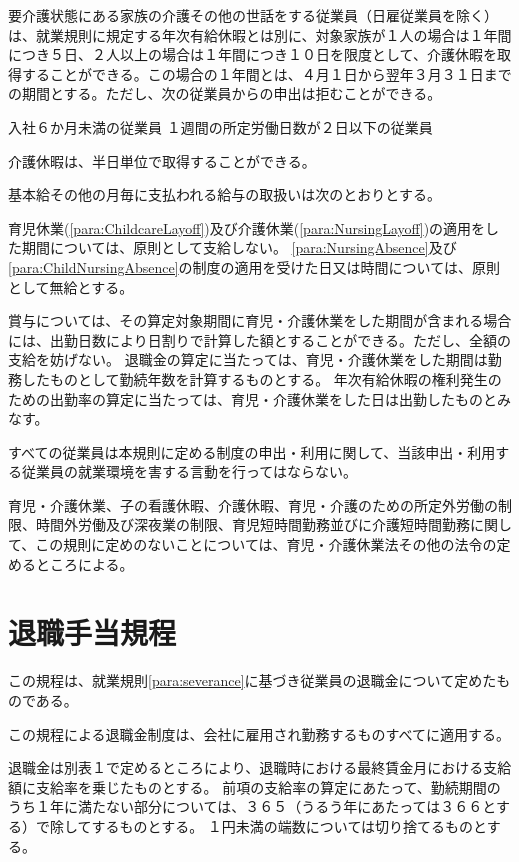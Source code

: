 \documentclass[10pt,a4paper,uplatex]{jsarticle}
\begin{document}
要介護状態にある家族の介護その他の世話をする従業員（日雇従業員を除く）は、就業規則に規定する年次有給休暇とは別に、対象家族が１人の場合は１年間につき５日、２人以上の場合は１年間につき１０日を限度として、介護休暇を取得することができる。この場合の１年間とは、４月１日から翌年３月３１日までの期間とする。ただし、次の従業員からの申出は拒むことができる。
\label{para:NursingAbsence}
\begin{enumerate}
    \itm 入社６か月未満の従業員
    \itm １週間の所定労働日数が２日以下の従業員
\end{enumerate}
\term 介護休暇は、半日単位で取得することができる。

基本給その他の月毎に支払われる給与の取扱いは次のとおりとする。
\begin{enumerate}
    \itm 育児休業(\ref{para:ChildcareLayoff})及び介護休業(\ref{para:NursingLayoff})の適用をした期間については、原則として支給しない。
    \itm \ref{para:NursingAbsence}及び\ref{para:ChildNursingAbsence}の制度の適用を受けた日又は時間については、原則として無給とする。
\end{enumerate}
\term 賞与については、その算定対象期間に育児・介護休業をした期間が含まれる場合には、出勤日数により日割りで計算した額とすることができる。ただし、全額の支給を妨げない。
\term 退職金の算定に当たっては、育児・介護休業をした期間は勤務したものとして勤続年数を計算するものとする。
\term 年次有給休暇の権利発生のための出勤率の算定に当たっては、育児・介護休業をした日は出勤したものとみなす。

すべての従業員は本規則に定める制度の申出・利用に関して、当該申出・利用する従業員の就業環境を害する言動を行ってはならない。

育児・介護休業、子の看護休暇、介護休暇、育児・介護のための所定外労働の制限、時間外労働及び深夜業の制限、育児短時間勤務並びに介護短時間勤務に関して、この規則に定めのないことについては、育児・介護休業法その他の法令の定めるところによる。


\clearpage
\section{退職手当規程}

この規程は、就業規則\ref{para:severance}に基づき従業員の退職金について定めたものである。

この規程による退職金制度は、会社に雇用され勤務するものすべてに適用する。

退職金は別表１で定めるところにより、退職時における最終賃金月における支給額に支給率を乗じたものとする。
\term 前項の支給率の算定にあたって、勤続期間のうち１年に満たない部分については、３６５（うるう年にあたっては３６６とする）で除してするものとする。
\term １円未満の端数については切り捨てるものとする。
\end{document}

